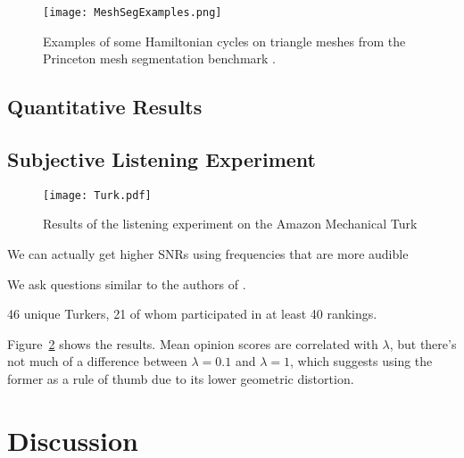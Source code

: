 \documentclass[runningheads]{llncs}
\begin{document}
\begin{figure}
  \centering
  \texttt{[image: MeshSegExamples.png]}
  \caption{Examples of some Hamiltonian cycles on triangle meshes from the Princeton mesh segmentation benchmark \cite{Chen:2009:ABF}.}
  \label{fig:meshsegexamples}
\end{figure}

\subsection{Quantitative Results}

\subsection{Subjective Listening Experiment}

\begin{figure}
  \centering
  \texttt{[image: Turk.pdf]}
  \caption{Results of the listening experiment on the Amazon Mechanical Turk}
  \label{fig:TurkResults}
\end{figure}


We can actually get higher SNRs using frequencies that are more audible

We ask questions similar to the authors of \cite{bassia2001robust}.

46 unique Turkers, 21 of whom participated in at least 40 rankings.

Figure~\ref{fig:TurkResults} shows the results.  Mean opinion scores are correlated with $\lambda$, but there's not much of a difference between $\lambda=0.1$ and $\lambda=1$, which suggests using the former as a rule of thumb due to its lower geometric distortion.

\section{Discussion}

%
%
%


%
\end{document}
